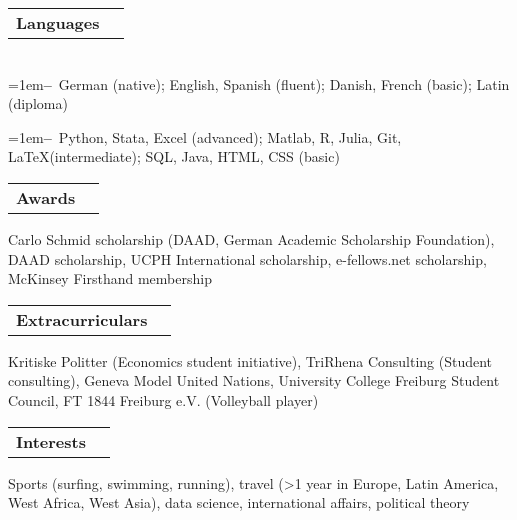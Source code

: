\documentclass[A4,11pt]{article}
\makeatletter
\newcommand{\Subheading}[4]{   
    \begin{tabular*}{0.97\textwidth}[t]{l@{\extracolsep{\fill}}r}
      \textbf{#1}\textit{\small #2} & \footnotesize #3 
      \end{tabular*}
      \small #4 
    \vspace{7pt}}
\newcommand{\myitem}[1]{\hangindent=1em\hangafter=1\textbf{--}~#1\par}
\makeatother
\begin{document}
    \Subheading
        {Languages}{}{}
        {\\
        \myitem{German (native); English, Spanish (fluent); Danish, French (basic); Latin (diploma)}
        \myitem{Python, Stata, Excel (advanced); Matlab, R, Julia, Git, \LaTeX\space(intermediate); SQL, Java, HTML, CSS (basic)}
        }
    

    \Subheading
        {Awards}{}{}
        {Carlo Schmid scholarship (DAAD, German Academic Scholarship Foundation), 
        DAAD scholarship, 
        UCPH International scholarship, 
        e-fellows.net scholarship, 
        McKinsey Firsthand membership
        } 

    \Subheading
        {Extracurriculars}{}{}
        {Kritiske Politter (Economics student initiative), TriRhena Consulting (Student consulting), 
        Geneva Model United Nations, University College Freiburg Student Council, FT 1844 Freiburg e.V. (Volleyball player)}{}

    \Subheading
        {Interests}{}{}
        {Sports (surfing, swimming, running), travel (>1 year in Europe, Latin America, West Africa, West Asia), data science, international affairs, political theory}

\vfill
{}
\end{document}
